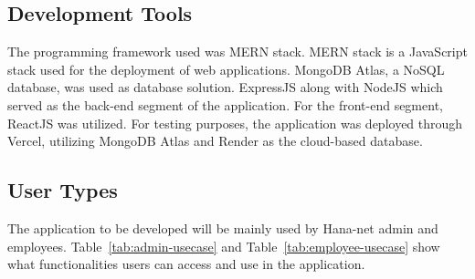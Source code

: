 \documentclass{icsthesis}
\begin{document}
\begin{mainmatter}
\subsection{\textbf{Development Tools}}
The programming framework used was MERN stack. MERN stack is a JavaScript stack used for the deployment of web applications. MongoDB Atlas, a NoSQL database, was used as database solution. ExpressJS along with NodeJS which served as the back-end segment of the application. For the front-end segment, ReactJS was utilized.
For testing purposes, the application was deployed through Vercel, utilizing MongoDB Atlas and Render as the cloud-based database.

\subsection{\textbf{User Types}}
The application to be developed will be mainly used by Hana-net admin and employees. Table~\ref{tab:admin-usecase} and Table~\ref{tab:employee-usecase} show what functionalities users can access and use in the application.  
	

\end{mainmatter}
\end{document}
